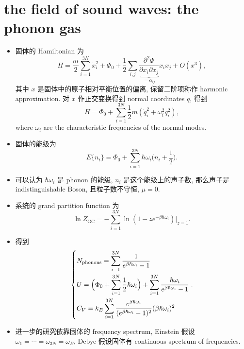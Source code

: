 \section{the field of sound waves: the phonon gas}
\begin{itemize}
	\item 固体的 Hamiltonian 为
	\begin{equation}
		H = \frac{m}{2} \sum_{i = 1}^{3 N} \dot{x}_i^2 + \Phi_0 + \frac{1}{2} \sum_{i, j} \underbrace{\frac{\partial^2 \Phi}{\partial x_i \partial x_j}}_{= \alpha_{i j}} x_i x_j + O(x^3),
	\end{equation}
	其中 $x$ 是固体中的原子相对平衡位置的偏离, 保留二阶项称作 harmonic approximation. 对 $x$ 作正交变换得到 normal coordinates $q$, 得到
	\begin{equation}
		H = \Phi_0 + \sum_{i = 1}^{3 N} \frac{1}{2} m (\dot{q}_i^2 + \omega_i^2 q_i^2),
	\end{equation}
	where $\omega_i$ are the characteristic frequencies of the normal modes.
	
	\item 固体的能级为
	\begin{equation}
		E\{n_i\} = \Phi_0 + \sum_{i = 1}^{3 N} \hbar \omega_i \Big( n_i + \frac{1}{2} \Big).
	\end{equation}
	
	\item 可以认为 $\hbar \omega_i$ 是 phonon 的能级, $n_i$ 是这个能级上的声子数, 那么声子是 indistinguishable Boson, 且粒子数不守恒, $\mu = 0$.
	
	\item 系统的 grand partition function 为
	\begin{equation}
		\ln Z_\text{GC} = - \sum_{i = 1}^{3 N} \ln(1 - z e^{- \beta \hbar \omega_i}) \Big|_{z = 1}.
	\end{equation}
	
	\item 得到
	\begin{equation}
		\begin{dcases}
			N_\text{phonons} = \sum_{i = 1}^{3 N} \frac{1}{e^{\beta \hbar \omega_i} - 1} \\
			U = \Big( \Phi_0 + \sum_{i = 1}^{3 N} \frac{1}{2} \hbar \omega_i \Big) + \sum_{i = 1}^{3 N} \frac{\hbar \omega_i}{e^{\beta \hbar \omega_i} - 1} \\
			C_V = k_B \sum_{i = 1}^{3 N} \frac{e^{\beta \hbar \omega_i}}{(e^{\beta \hbar \omega_i} - 1)^2} (\beta \hbar \omega_i)^2
		\end{dcases}.
	\end{equation}
	
	\item 进一步的研究依靠固体的 frequency spectrum, Einstein 假设 $\omega_1 = \cdots = \omega_{3 N} = \omega_E$, Debye 假设固体有 continuous spectrum of frequencies.
\end{itemize}

